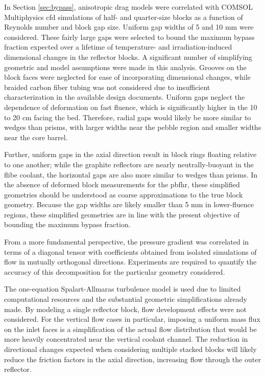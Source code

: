 In Section \ref{sec:bypass}, anisotropic drag models were correlated with COMSOL Multiphysics \gls{cfd} simulations of half- and quarter-size blocks as a function of Reynolds number and block gap size. Uniform gap widths of 5 and 10 \si{\milli\meter} were considered. These fairly large gaps were selected to bound the maximum bypass fraction expected over a lifetime of temperature- and irradiation-induced dimensional changes in the reflector blocks. A significant number of simplifying geometric and model assumptions were made in this analysis. Grooves on the block faces were neglected for ease of incorporating dimensional changes, while braided carbon fiber tubing was not considered due to insufficient characterization in the available design documents. Uniform gaps neglect the dependence of deformation on fast fluence, which is significantly higher in the 10 to 20 \si{\centi\meter} facing the bed. Therefore, radial gaps would likely be more similar to wedges than prisms, with larger widths near the pebble region and smaller widths near the core barrel.

Further, uniform gaps in the axial direction result in block rings floating relative to one another; while the graphite reflectors are nearly neutrally-buoyant in the \gls{flibe} coolant, the horizontal gaps are also more similar to wedges than prisms. In the absence of deformed block measurements for the \gls{pbfhr}, these simplified geometries should be understood as coarse approximations to the true block geometry. Because the gap widths are likely smaller than 5 \si{\milli\meter} in lower-fluence regions, these simplified geometries are in line with the present objective of bounding the maximum bypass fraction.

From a more fundamental perspective, the pressure gradient was correlated in terms of a diagonal tensor with coefficients obtained from isolated simulations of flow in mutually orthogonal directions. Experiments are required to quantify the accuracy of this decomposition for the particular geometry considered.

The one-equation Spalart-Allmaras turbulence model is used due to limited computational resources and the substantial geometric simplifications already made. By modeling a single reflector block, flow development effects were not considered. For the vertical flow cases in particular, imposing a uniform mass flux on the inlet faces is a simplification of the actual flow distribution that would be more heavily concentrated near the vertical coolant channel. The reduction in directional changes expected when considering multiple stacked blocks will likely reduce the friction factors in the axial direction, increasing flow through the outer reflector.

